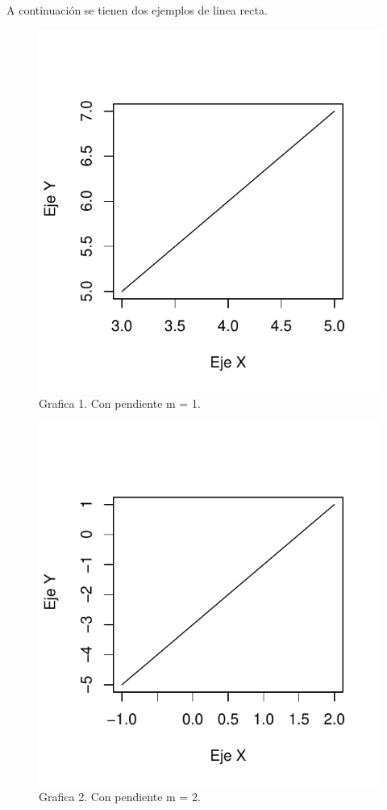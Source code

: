 \documentclass[12pt,a4paper]{report}
\begin{document}
A continuación se tienen dos ejemplos de linea recta.


\begin{figure}
\centering
\includegraphics[scale = 0.8]{Recta1}
\caption{Grafica 1. Con pendiente m = 1.}
\label{fig:Recta1}
\end{figure}

\begin{figure}
\centering
\includegraphics[scale = 0.8]{Recta2}
\caption{Grafica 2. Con pendiente m = 2.}
\label{fig:Recta2}
\end{figure}
\end{document}
